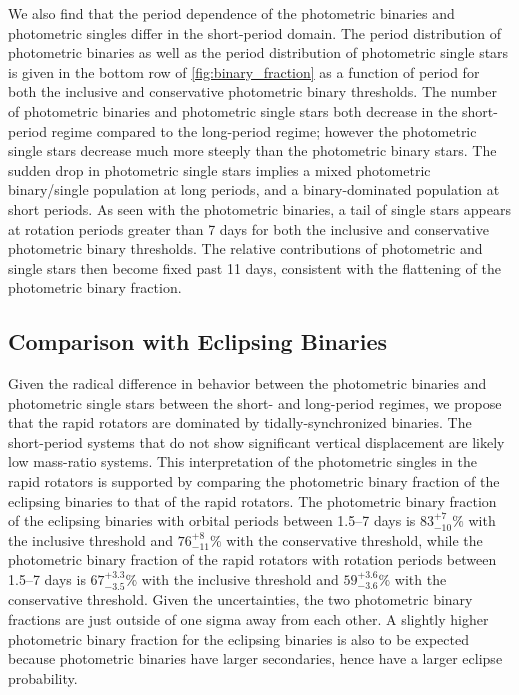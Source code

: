\documentclass[twocolumn]{aastex6}
\begin{document}
We also find that the period dependence of the photometric binaries and
photometric singles differ in the short-period domain. The period distribution
of photometric binaries as well as the period distribution of photometric 
single stars is given in the bottom row of \cref{fig:binary_fraction} as a 
function of period for both the inclusive and 
conservative photometric binary thresholds. The number of photometric binaries 
and photometric single stars both decrease in the short-period regime compared to the 
long-period regime; however the photometric single stars decrease much more 
steeply than the photometric binary stars. The sudden drop in photometric 
single stars implies a mixed photometric binary/single population at long 
periods, and a binary-dominated population at short periods. As seen with the
photometric binaries, a tail of single stars appears at rotation periods 
greater than 7 days for both the inclusive and conservative photometric binary 
thresholds. The relative contributions of photometric and single stars then 
become fixed past 11 days, consistent with the flattening of the photometric 
binary fraction. 

\subsection{Comparison with Eclipsing Binaries}
\label{sec:synch}

Given the radical difference in behavior between the photometric binaries and
photometric single stars between the short- and long-period regimes, we propose that the 
rapid rotators are dominated by tidally-synchronized binaries. The 
short-period systems that do not show significant vertical displacement are 
likely low mass-ratio systems. This interpretation of the photometric singles 
in the rapid rotators is supported by comparing the photometric binary 
fraction of the eclipsing binaries to that of the rapid rotators. The 
photometric binary fraction of the eclipsing binaries with orbital periods 
between 1.5--7 days is \(83^{+7}_{-10}\%\) with the inclusive threshold and 
\(76^{+8}_{-11}\%\) with the conservative threshold, while the photometric 
binary fraction of the rapid rotators with rotation periods between 1.5--7
days is \(67^{+3.3}_{-3.5}\%\) with the inclusive threshold and
\(59^{+3.6}_{-3.6}\%\) with the conservative threshold.  Given the
uncertainties, the two photometric binary fractions are just outside of one 
sigma away from each other. A slightly higher photometric binary fraction for
the eclipsing binaries is also to be expected because photometric binaries 
have larger secondaries, hence have a larger eclipse probability.
\end{document}
